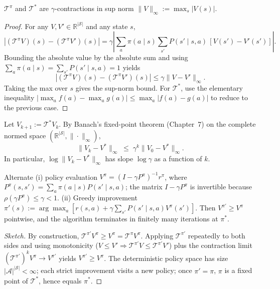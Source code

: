 \begin{theorem}[Contraction]
$\mathcal{T}^\pi$ and $\mathcal{T}^*$ are $\gamma$-contractions in sup norm $\|V\|_\infty := \max_s |V(s)|$.
\end{theorem}

\begin{proof}
For any $V, V' \in \mathbb{R}^{|\mathcal{S}|}$ and any state $s$,
\[
|(\mathcal{T}^\pi V)(s) - (\mathcal{T}^\pi V')(s)|
= \gamma\left| \sum_a \pi(a\mid s) \sum_{s'} P(s'\mid s,a)\, [V(s')-V'(s')] \right|.
\]
Bounding the absolute value by the absolute sum and using $\sum_a \pi(a\mid s) = \sum_{s'} P(s'\mid s,a) = 1$ yields
\[
|(\mathcal{T}^\pi V)(s) - (\mathcal{T}^\pi V')(s)| \le \gamma \|V - V'\|_\infty.
\]
Taking the max over $s$ gives the sup-norm bound. For $\mathcal{T}^*$, use the elementary inequality $|\max_a f(a) - \max_a g(a)| \le \max_a |f(a) - g(a)|$ to reduce to the previous case.
\end{proof}

\begin{corollary}
Let $V_{k+1} := \mathcal{T}^* V_k$. By Banach's fixed-point theorem (Chapter~7) on the complete normed space $(\mathbb{R}^{|\mathcal{S}|},\|\cdot\|_\infty)$,
\[
\|V_k - V^*\|_\infty \;\le\; \gamma^k \|V_0 - V^*\|_\infty.
\]
In particular, $\log\|V_k - V^*\|_\infty$ has slope $\log \gamma$ as a function of $k$.
\end{corollary}

\begin{theorem}
Alternate (i) policy evaluation $V^\pi = (I - \gamma P^\pi)^{-1} r^\pi$, where $P^\pi(s,s') = \sum_a \pi(a\mid s)P(s'\mid s,a)$; the matrix $I - \gamma P^\pi$ is invertible because $\rho(\gamma P^\pi)\le \gamma <1$. (ii) Greedy improvement $\pi'(s) := \arg\max_a [r(s,a) + \gamma \sum_{s'} P(s'\mid s,a) V^\pi(s')]$. Then $V^{\pi'}\ge V^\pi$ pointwise, and the algorithm terminates in finitely many iterations at $\pi^*$.
\end{theorem}

\begin{proof}[Sketch]
By construction, $\mathcal{T}^{\pi'} V^\pi \ge V^\pi = \mathcal{T}^\pi V^\pi$. Applying $\mathcal{T}^{\pi'}$ repeatedly to both sides and using monotonicity ($V\le V'\Rightarrow \mathcal{T}^{\pi'} V \le \mathcal{T}^{\pi'} V'$) plus the contraction limit $(\mathcal{T}^{\pi'})^k V^\pi \to V^{\pi'}$ yields $V^{\pi'} \ge V^\pi$. The deterministic policy space has size $|\mathcal{A}|^{|\mathcal{S}|} <\infty$; each strict improvement visits a new policy; once $\pi' = \pi$, $\pi$ is a fixed point of $\mathcal{T}^*$, hence equals $\pi^*$.
\end{proof}

